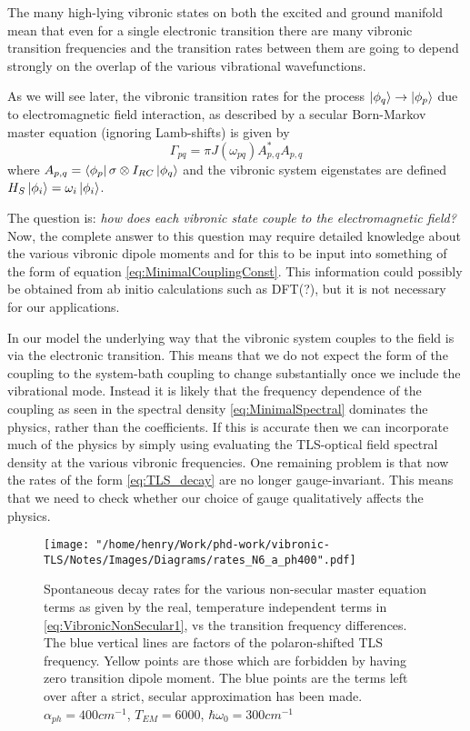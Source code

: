 \documentclass[]{article}
\begin{document}
The many high-lying vibronic states on both the excited and ground manifold mean that even for a single electronic transition there are many vibronic transition frequencies and the transition rates between them are going to depend strongly on the overlap of the various vibrational wavefunctions. 

As we will see later, the vibronic transition rates for the process $\ket{\phi_q}\to\ket{\phi_p}$ due to electromagnetic field interaction, as described by a secular Born-Markov master equation (ignoring Lamb-shifts) is given by
\begin{equation}
\Gamma_{pq} = \pi J(\omega_{pq}) A_{p,q}^{*}A_{p,q}
\end{equation}
where $A_{p,q}=\bra{\phi_p}\sigma\otimes I_{RC}\ket{\phi_q}$ and the vibronic system eigenstates are defined $H_S\ket{\phi_i}= \omega_i\ket{\phi_i}$.

The question is: \textit{how does each vibronic state couple to the electromagnetic field?} Now, the complete answer to this question may require detailed knowledge about the various vibronic dipole moments and for this to be input into something of the form of equation \ref{eq:MinimalCouplingConst}. This information could possibly be obtained from ab initio calculations such as DFT(?), but it is not necessary for our applications.

In our model the underlying way that the vibronic system couples to the field is via the electronic transition. This means that we do not expect the form of the coupling to the system-bath coupling to change substantially once we include the vibrational mode. Instead it is likely that the frequency dependence of the coupling as seen in the spectral density \ref{eq:MinimalSpectral} dominates the physics, rather than the coefficients. If this is accurate then we can incorporate much of the physics by simply using evaluating the TLS-optical field spectral density at the various vibronic frequencies. One remaining problem is that now the rates of the form \ref{eq:TLS_decay} are no longer gauge-invariant. This means that we need to check whether our choice of gauge qualitatively affects the physics.

\begin{figure}[t]
	\centering
	\texttt{[image: "/home/henry/Work/phd-work/vibronic-TLS/Notes/Images/Diagrams/rates\_N6\_a\_ph400".pdf]}
	\caption{Spontaneous decay rates for the various non-secular master equation terms as given by the real, temperature independent terms in \ref{eq:VibronicNonSecular1}, vs the transition frequency differences. The blue vertical lines are factors of the polaron-shifted TLS frequency. Yellow points are those which are forbidden by having zero transition dipole moment. The blue points are the terms left over after a strict, secular approximation has been made. $\alpha_{ph}=400 cm^{-1}$, $T_{EM} =6000$, $\hbar\omega_0 = 300cm^{-1}$}
	\label{fig:DecayRates_FrequencyDiffs}
\end{figure}
\end{document}
